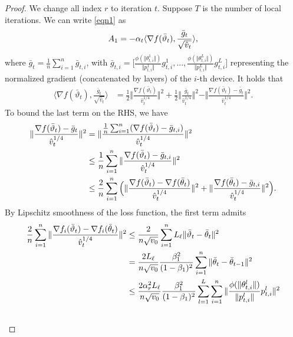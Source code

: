 \documentclass[11pt]{article}
\begin{document}
\begin{proof}
We change all index $r$ to iteration $t$. 
Suppose $T$ is the number of local iterations. We can write \eqref{eqn1} as
\begin{align}\notag
    A_1=-\alpha_t \langle \nabla f(\bar \vartheta_t),\frac{\bar g_t}{\sqrt{\hat v_t}} \rangle,
\end{align}
where $\bar g_t=\frac{1}{n}\sum_{i=1}^n \bar g_{t,i}$, with $\bar g_{t,i}=\Big[\frac{\phi(\Vert \theta_{t,i}^1\Vert)}{\Vert p_{t,i}^1\Vert}g_{t,i}^1,..., \frac{\phi(\Vert \theta_{t,i}^L\Vert)}{\Vert p_{t,i}^L\Vert}g_{t,i}^L   \Big]$ representing the normalized gradient (concatenated by layers) of the $i$-th device. It holds that
\begin{align}
    \langle \nabla f(\bar \vartheta_t),\frac{\bar g_t}{\sqrt{\hat v_t}} \rangle&=\frac{1}{2}\Vert \frac{\nabla f(\bar\vartheta_t) }{\hat v_t^{1/4}}\Vert^2+\frac{1}{2}\Vert \frac{\bar g_t }{\hat v_t^{1/4}}\Vert^2-\Vert \frac{\nabla f(\bar\vartheta_t)-\bar g_t }{\hat v_t^{1/4}}\Vert^2.  \label{eqn:x1}
\end{align}
To bound the last term on the RHS, we have
\begin{align}\notag
    \Vert \frac{\nabla f(\bar\vartheta_t)-\bar g_t }{\hat v_t^{1/4}}\Vert^2&=\Vert \frac{\frac{1}{n}\sum_{i=1}^n (\nabla f(\bar\vartheta_t)-\bar g_{t,i})}{\hat v_t^{1/4}} \Vert^2\\\notag
    &\leq \frac{1}{n}\sum_{i=1}^n\Vert \frac{\nabla f(\bar\vartheta_t)-\bar g_{t,i}}{\hat v_t^{1/4}} \Vert^2\\\notag
    &\leq \frac{2}{n}\sum_{i=1}^n \Big(\Vert \frac{\nabla f(\bar\vartheta_t)-\nabla f(\bar\theta_t)}{\hat v_t^{1/4}} \Vert^2+\Vert \frac{\nabla f(\bar\theta_t)-\bar g_{t,i}}{\hat v_t^{1/4}} \Vert^2  \Big). 
\end{align}
By Lipschitz smoothness of the loss function, the first term admits
\begin{align}\notag
    \frac{2}{n}\sum_{i=1}^n\Vert \frac{\nabla f_i(\bar\vartheta_t)-\nabla f_i(\bar\theta_t)}{\hat v_t^{1/4}} \Vert^2&\leq \frac{2}{n \sqrt{v_0}}\sum_{i=1}^n L_\ell\Vert \bar\vartheta_t-\bar\theta_t\Vert^2  \\\notag
    &=\frac{2L_\ell}{n \sqrt{v_0}}\frac{\beta_1^2}{(1-\beta_1)^2}\sum_{i=1}^n \Vert \bar\theta_t-\bar\theta_{t-1}\Vert ^2\\\notag
    &\leq \frac{2\alpha_r^2 L_\ell }{n \sqrt{v_0}}\frac{\beta_1^2}{(1-\beta_1)^2} \sum_{l=1}^L \sum_{i=1}^n\Vert \frac{\phi(\Vert \theta_{t,i}^l\Vert)}{\Vert p_{t,i}^l\Vert}p_{t,i}^l \Vert^2\\\notag

\end{align}
\end{proof}
\end{document}
